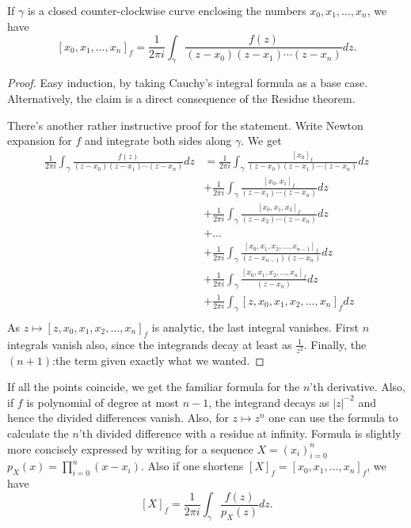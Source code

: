 \begin{lem}\label{div_cauchy}
If $\gamma$ is a closed counter-clockwise curve enclosing the numbers $x_{0}, x_{1}, \ldots, x_{n}$, we have
\[
	[x_{0}, x_{1}, \ldots, x_{n}]_{f} = \frac{1}{2 \pi i} \int_{\gamma} \frac{f(z)}{(z - x_{0})(z - x_{1}) \cdots (z - x_{n})} dz.
\]
\end{lem}
\begin{proof}
Easy induction, by taking Cauchy's integral formula as a base case. Alternatively, the claim is a direct consequence of the Residue theorem.

There's another rather instructive proof for the statement. Write Newton expansion for $f$ and integrate both sides along $\gamma$. We get
\begin{align*}
	\frac{1}{2 \pi i} \int_{\gamma} \frac{f(z)}{(z - x_{0})(z - x_{1}) \cdots (z - x_{n})} dz &= \frac{1}{2 \pi i} \int_{\gamma} \frac{[x_{0}]_{f}}{(z - x_{0})(z - x_{1}) \cdots (z - x_{n})} dz \\
	&+ \frac{1}{2 \pi i} \int_{\gamma} \frac{[x_{0}, x_{1}]_{f}}{(z - x_{1}) \cdots (z - x_{n})} dz \\
	&+ \frac{1}{2 \pi i} \int_{\gamma} \frac{[x_{0}, x_{1}, x_{2}]_{f}}{(z - x_{2}) \cdots (z - x_{n})} dz \\
	&+ \ldots \\
	&+ \frac{1}{2 \pi i} \int_{\gamma} \frac{[x_{0}, x_{1}, x_{2}, \ldots, x_{n - 1}]_{f}}{(z - x_{n - 1})(z - x_{n})} dz \\
	&+ \frac{1}{2 \pi i} \int_{\gamma} \frac{[x_{0}, x_{1}, x_{2}, \ldots, x_{n}]_{f}}{(z - x_{n})} dz \\
	&+ \frac{1}{2 \pi i} \int_{\gamma} [z, x_{0}, x_{1}, x_{2}, \ldots, x_{n}]_{f} dz \\
\end{align*}
As $z \mapsto [z, x_{0}, x_{1}, x_{2}, \ldots, x_{n}]_{f}$ is analytic, the last integral vanishes. First $n$ integrals vanish also, since the integrands decay at least as $\frac{1}{z^2}$. Finally, the $(n + 1)$:the term given exactly what we wanted.
\end{proof}

If all the points coincide, we get the familiar formula for the $n$'th derivative. Also, if $f$ is polynomial of degree at most $n - 1$, the integrand decays as $|z|^{-2}$ and hence the divided differences vanish. Also, for $z \mapsto z^{n}$ one can use the formula to calculate the $n$'th divided difference with a residue at infinity. Formula is slightly more concisely expressed by writing for a sequence $X = (x_{i})_{i = 0}^{n}$ $p_{X}(x) = \prod_{i = 0}^{n} (x - x_{i})$. Also if one shortens $[X]_{f} = [x_{0}, x_{1}, \ldots, x_{n}]_{f}$, we have
\[
	[X]_{f} = \frac{1}{2 \pi i} \int_{\gamma} \frac{f(z)}{p_{X}(z)} dz.
\]


